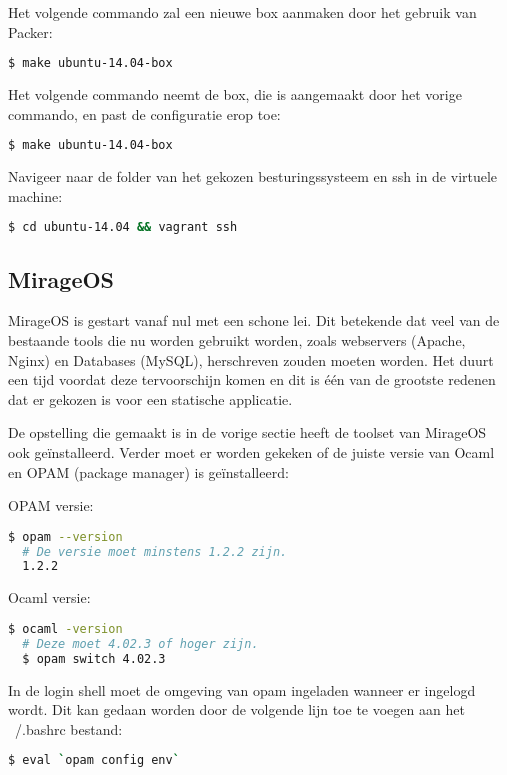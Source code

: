 \noindent Het volgende commando zal een nieuwe box aanmaken door het gebruik van Packer:
\begin{lstlisting}[language=bash]
  $ make ubuntu-14.04-box
\end{lstlisting}

\noindent Het volgende commando neemt de box, die is aangemaakt door het vorige commando, en past de configuratie erop toe:
\begin{lstlisting}[language=bash]
  $ make ubuntu-14.04-box
\end{lstlisting}

\noindent Navigeer naar de folder van het gekozen besturingssysteem en ssh in de virtuele machine: 
\begin{lstlisting}[language=bash]
  $ cd ubuntu-14.04 && vagrant ssh
\end{lstlisting}

\subsection{MirageOS}

MirageOS is gestart vanaf nul met een schone lei. Dit betekende dat veel van de bestaande tools die nu worden gebruikt worden, zoals webservers (Apache, Nginx) en Databases (MySQL), herschreven zouden moeten worden. Het duurt een tijd voordat deze tervoorschijn komen en dit is één van de grootste redenen dat er gekozen is voor een statische applicatie.

De opstelling die gemaakt is in de vorige sectie heeft de toolset van MirageOS ook geïnstalleerd. Verder moet er worden gekeken of de juiste versie van Ocaml en OPAM (package manager) is geïnstalleerd:

\noindent OPAM versie:
\begin{lstlisting}[language=bash]
  $ opam --version
  # De versie moet minstens 1.2.2 zijn.
  1.2.2
\end{lstlisting}

\noindent Ocaml versie:
\begin{lstlisting}[language=bash]
  $ ocaml -version
  # Deze moet 4.02.3 of hoger zijn.
  $ opam switch 4.02.3
\end{lstlisting}

In de login shell moet de omgeving van opam ingeladen wanneer er ingelogd wordt. Dit kan gedaan worden door de volgende lijn toe te voegen aan het ~/.bashrc bestand:

\begin{lstlisting}[language=bash]
  $ eval `opam config env`
\end{lstlisting}


